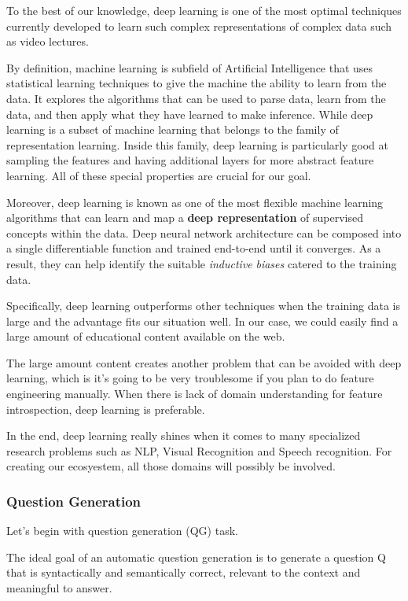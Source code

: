 \documentclass{acm_proc_article-sp}
\begin{document}
To the best of our knowledge, deep learning is one of the most optimal
techniques currently developed to learn such complex representations of
complex data such as video lectures.

By definition, machine learning is subfield of Artificial Intelligence
that uses statistical learning techniques to give the machine the
ability to learn from the data. It explores the algorithms that can be
used to parse data, learn from the data, and then apply what they have
learned to make inference. While deep learning is a subset of machine
learning that belongs to the family of representation learning. Inside
this family, deep learning is particularly good at sampling the features
and having additional layers for more abstract feature learning. All of
these special properties are crucial for our goal.

Moreover, deep learning is known as one of the most flexible machine
learning algorithms that can learn and map a \textbf{deep
representation} of supervised concepts within the data. Deep neural
network architecture can be composed into a single differentiable
function and trained end-to-end until it converges. As a result, they
can help identify the suitable \emph{inductive} \emph{biases} catered to
the training data.

Specifically, deep learning outperforms other techniques when the
training data is large and the advantage fits our situation well. In our
case, we could easily find a large amount of educational content
available on the web.

The large amount content creates another problem that can be avoided
with deep learning, which is it's going to be very troublesome if you
plan to do feature engineering manually. When there is lack of domain
understanding for feature introspection, deep learning is preferable.

In the end, deep learning really shines when it comes to many
specialized research problems such as NLP, Visual Recognition and Speech
recognition. For creating our ecosyestem, all those domains will
possibly be involved.

\subsubsection{Question Generation}\label{question-generation}

Let's begin with question generation (QG) task.

The ideal goal of an automatic question generation is to generate a
question Q that is syntactically and semantically correct, relevant to
the context and meaningful to answer.
\end{document}
